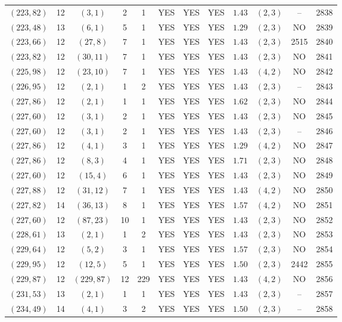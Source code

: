 \begin{longtable}{|c|c|c|c|c|c|c|c|c|c|c|c|}
$(223,82)$ & 12 & $(3,1)$ & 2 & 1 & YES & YES & YES & $1.43$ & $(2,3)$ & -- & 2838\\
$(223,48)$ & 13 & $(6,1)$ & 5 & 1 & YES & YES & YES & $1.29$ & $(2,3)$ & NO & 2839\\
$(223,66)$ & 12 & $(27,8)$ & 7 & 1 & YES & YES & YES & $1.43$ & $(2,3)$ & 2515 & 2840\\
$(223,82)$ & 12 & $(30,11)$ & 7 & 1 & YES & YES & YES & $1.43$ & $(2,3)$ & NO & 2841\\
$(225,98)$ & 12 & $(23,10)$ & 7 & 1 & YES & YES & YES & $1.43$ & $(4,2)$ & NO & 2842\\
$(226,95)$ & 12 & $(2,1)$ & 1 & 2 & YES & YES & YES & $1.43$ & $(2,3)$ & -- & 2843\\
$(227,86)$ & 12 & $(2,1)$ & 1 & 1 & YES & YES & YES & $1.62$ & $(2,3)$ & NO & 2844\\
$(227,60)$ & 12 & $(3,1)$ & 2 & 1 & YES & YES & YES & $1.43$ & $(2,3)$ & NO & 2845\\
$(227,60)$ & 12 & $(3,1)$ & 2 & 1 & YES & YES & YES & $1.43$ & $(2,3)$ & -- & 2846\\
$(227,86)$ & 12 & $(4,1)$ & 3 & 1 & YES & YES & YES & $1.29$ & $(4,2)$ & NO & 2847\\
$(227,86)$ & 12 & $(8,3)$ & 4 & 1 & YES & YES & YES & $1.71$ & $(2,3)$ & NO & 2848\\
$(227,60)$ & 12 & $(15,4)$ & 6 & 1 & YES & YES & YES & $1.43$ & $(2,3)$ & NO & 2849\\
$(227,88)$ & 12 & $(31,12)$ & 7 & 1 & YES & YES & YES & $1.43$ & $(4,2)$ & NO & 2850\\
$(227,82)$ & 14 & $(36,13)$ & 8 & 1 & YES & YES & YES & $1.57$ & $(4,2)$ & NO & 2851\\
$(227,60)$ & 12 & $(87,23)$ & 10 & 1 & YES & YES & YES & $1.43$ & $(2,3)$ & NO & 2852\\
$(228,61)$ & 13 & $(2,1)$ & 1 & 2 & YES & YES & YES & $1.43$ & $(2,3)$ & NO & 2853\\
$(229,64)$ & 12 & $(5,2)$ & 3 & 1 & YES & YES & YES & $1.57$ & $(2,3)$ & NO & 2854\\
$(229,95)$ & 12 & $(12,5)$ & 5 & 1 & YES & YES & YES & $1.50$ & $(2,3)$ & 2442 & 2855\\
$(229,87)$ & 12 & $(229,87)$ & 12 & 229 & YES & YES & YES & $1.43$ & $(4,2)$ & NO & 2856\\
$(231,53)$ & 13 & $(2,1)$ & 1 & 1 & YES & YES & YES & $1.43$ & $(2,3)$ & -- & 2857\\
$(234,49)$ & 14 & $(4,1)$ & 3 & 2 & YES & YES & YES & $1.50$ & $(2,3)$ & -- & 2858\\

\end{longtable}
